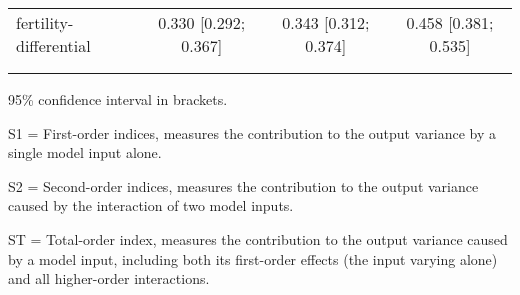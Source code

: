 \begin{table}[htp]
\begin{threeparttable}
\begin{tabular}{lccc}
	  \hspace{1.5em} fertility-differential & 0.330 [0.292; 0.367]   & 0.343 [0.312; 0.374]   & 0.458 [0.381; 0.535] \\
	 \\
\addlinespace
\hline
\end{tabular}
\begin{tablenotes}
\scriptsize
\item 95\% confidence interval in brackets.
\item S1 = First-order indices,  measures the contribution to the output variance by a single model input alone.
\item S2 = Second-order indices,  measures the contribution to the output variance caused by the interaction of two model inputs.
\item ST = Total-order index, measures the contribution to the output variance caused by a model input, including both its first-order effects (the input varying alone) and all higher-order interactions.
\end{tablenotes}
\end{threeparttable}
\end{table}